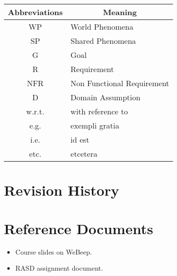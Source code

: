 \begin{table}[H]
    \centering
    \begin{tabular}{|c|l|}
    \hline
    \rowcolor[HTML]{B8C8D5} 
    \textbf{Abbreviations} & \multicolumn{1}{c|}{\cellcolor[HTML]{B8C8D5}\textbf{Meaning}} \\ \hline
    WP & World Phenomena  \\ \hline
    SP & Shared Phenomena \\ \hline
    G  & Goal             \\ \hline
    R  & Requirement             \\ \hline
    NFR  & Non Functional Requirement             \\ \hline
    D  & Domain Assumption             \\ \hline
    w.r.t. & with reference to \\ \hline
    e.g. & exempli gratia \\ \hline
    i.e. & id est \\ \hline
    etc. & etcetera \\ \hline
    \end{tabular}
\end{table}

\section{Revision History}

\section{Reference Documents}
\begin{itemize}
    \item Course slides on WeBeep. 
    \item RASD assignment document.
\end{itemize}


